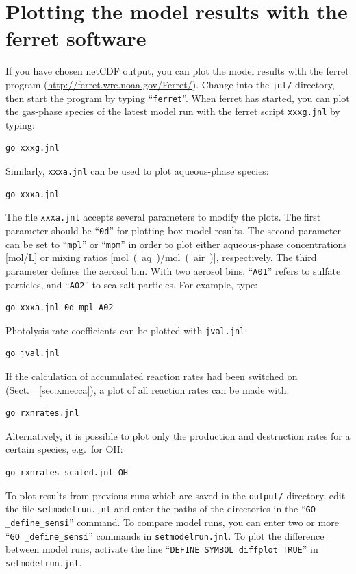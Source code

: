 \documentclass[twoside]{article}
\begin{document}
\section{Plotting the model results with the ferret software}
\label{sec:ferret}

If you have chosen netCDF output, you can plot the model results with
the ferret program (\url{http://ferret.wrc.noaa.gov/Ferret/}). Change
into the \verb|jnl/| directory, then start the program by typing
``\verb|ferret|''. When ferret has started, you can plot the gas-phase
species of the latest model run with the ferret script \verb|xxxg.jnl|
by typing:
\begin{verbatim}
go xxxg.jnl
\end{verbatim}
Similarly, \verb|xxxa.jnl| can be used to plot aqueous-phase species:
\begin{verbatim}
go xxxa.jnl
\end{verbatim}
The file \verb|xxxa.jnl| accepts several parameters to modify the plots.
The first parameter should be ``\verb|0d|'' for plotting box model
results. The second parameter can be set to ``\verb|mpl|'' or
``\verb|mpm|'' in order to plot either aqueous-phase concentrations
[\unit{mol/L}] or mixing ratios [\unit{mol(aq)/mol(air)}], respectively.
The third parameter defines the aerosol bin. With two aerosol bins,
``\verb|A01|'' refers to sulfate particles, and ``\verb|A02|'' to
sea-salt particles. For example, type:
\begin{verbatim}
go xxxa.jnl 0d mpl A02
\end{verbatim}
Photolysis rate coefficients can be plotted with \verb|jval.jnl|:
\begin{verbatim}
go jval.jnl
\end{verbatim}
If the calculation of accumulated reaction rates had been switched on
(Sect.~~\ref{sec:xmecca}), a plot of all reaction rates can be made
with:
\begin{verbatim}
go rxnrates.jnl
\end{verbatim}
Alternatively, it is possible to plot only the production and
destruction rates for a certain species, e.g.\ for OH:
\begin{verbatim}
go rxnrates_scaled.jnl OH
\end{verbatim}
To plot results from previous runs which are saved in the \verb|output/|
directory, edit the file \verb|setmodelrun.jnl| and enter the paths of
the directories in the ``\verb|GO _define_sensi|'' command. To compare
model runs, you can enter two or more ``\verb|GO _define_sensi|''
commands in \verb|setmodelrun.jnl|. To plot the difference between model
runs, activate the line ``\verb|DEFINE SYMBOL diffplot TRUE|'' in
\verb|setmodelrun.jnl|.
\end{document}

